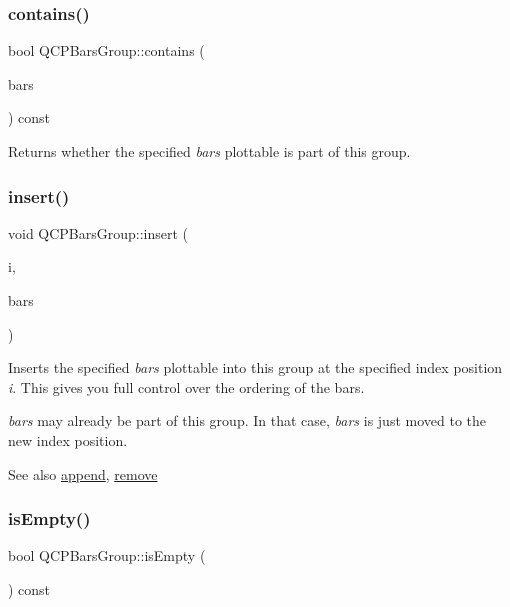 \subsubsection{\texorpdfstring{contains()}{contains()}}
{\footnotesize\ttfamily bool Q\+C\+P\+Bars\+Group\+::contains (\begin{DoxyParamCaption}\item[{\hyperlink{class_q_c_p_bars}{Q\+C\+P\+Bars} $\ast$}]{bars }\end{DoxyParamCaption}) const\hspace{0.3cm}{\ttfamily [inline]}}

Returns whether the specified {\itshape bars} plottable is part of this group. \hypertarget{class_q_c_p_bars_group_a309a5f7233db189f3ea9c2d04ece6c13}{}\label{class_q_c_p_bars_group_a309a5f7233db189f3ea9c2d04ece6c13} 
\subsubsection{\texorpdfstring{insert()}{insert()}}
{\footnotesize\ttfamily void Q\+C\+P\+Bars\+Group\+::insert (\begin{DoxyParamCaption}\item[{int}]{i,  }\item[{\hyperlink{class_q_c_p_bars}{Q\+C\+P\+Bars} $\ast$}]{bars }\end{DoxyParamCaption})}

Inserts the specified {\itshape bars} plottable into this group at the specified index position {\itshape i}. This gives you full control over the ordering of the bars.

{\itshape bars} may already be part of this group. In that case, {\itshape bars} is just moved to the new index position.

\begin{DoxySeeAlso}{See also}
\hyperlink{class_q_c_p_bars_group_a809ed63cc4ff7cd5b0b8c96b470163d3}{append}, \hyperlink{class_q_c_p_bars_group_a215e28a5944f1159013a0e19169220e7}{remove} 
\end{DoxySeeAlso}
\hypertarget{class_q_c_p_bars_group_aac959e79e852e8ef9aea6e0449ad000a}{}\label{class_q_c_p_bars_group_aac959e79e852e8ef9aea6e0449ad000a} 
\subsubsection{\texorpdfstring{is\+Empty()}{isEmpty()}}
{\footnotesize\ttfamily bool Q\+C\+P\+Bars\+Group\+::is\+Empty (\begin{DoxyParamCaption}{ }\end{DoxyParamCaption}) const\hspace{0.3cm}{\ttfamily [inline]}}

